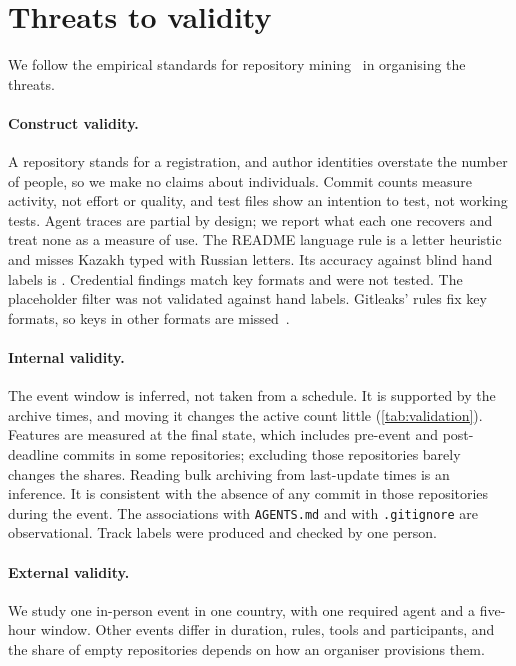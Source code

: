 \documentclass{article}
\begin{document}
\section{Threats to validity}\label{sec:threats}

We follow the empirical standards for repository mining~\cite{ralph2020standards} in organising the threats.

\paragraph{Construct validity.}
A repository stands for a registration, and author identities overstate the number of people, so we make no claims about individuals. Commit counts measure activity, not effort or quality, and test files show an intention to test, not working tests. Agent traces are partial by design; we report what each one recovers and treat none as a measure of use. The README language rule is a letter heuristic and misses Kazakh typed with Russian letters. Its accuracy against blind hand labels is . Credential findings match key formats and were not tested. The placeholder filter was not validated against hand labels. Gitleaks' rules fix key formats, so keys in other formats are missed~\cite{basak2023tools}.

\paragraph{Internal validity.}
The event window is inferred, not taken from a schedule. It is supported by the archive times, and moving it changes the active count little (\cref{tab:validation}). Features are measured at the final state, which includes pre-event and post-deadline commits in some repositories; excluding those repositories barely changes the shares. Reading bulk archiving from last-update times is an inference. It is consistent with the absence of any commit in those repositories during the event. The associations with \texttt{AGENTS.md} and with \texttt{.gitignore} are observational. Track labels were produced and checked by one person.

\paragraph{External validity.}
We study one in-person event in one country, with one required agent and a five-hour window. Other events differ in duration, rules, tools and participants, and the share of empty repositories depends on how an organiser provisions them.
\end{document}
